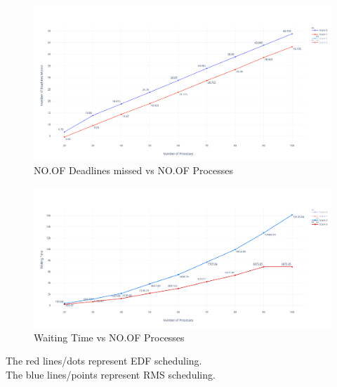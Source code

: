 \documentclass[15pt]{article}
\begin{document}
\begin{figure}[ht]
    \centering
    \includegraphics[width=1.25\textwidth]{1os2-assgn3.png}
    \caption{NO.OF Deadlines missed vs NO.OF Processes}
    \label{fig:Deadlines missed}
\end{figure} 

\begin{figure}[ht]
    \centering
    \includegraphics[width=1.25\textwidth]{os2-assgn3.png}
    \caption{Waiting Time vs NO.OF Processes}
    \label{fig:waiting time}
\end{figure}
The red lines/dots represent EDF scheduling.\\
The blue lines/points represent RMS scheduling.
\end{document}

